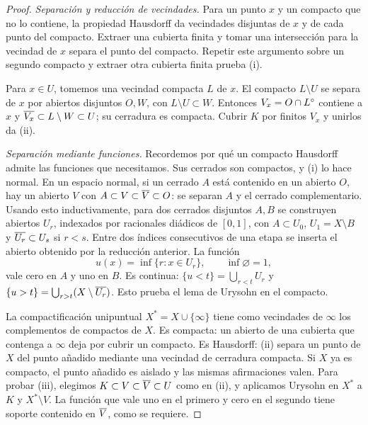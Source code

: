 \begin{proof}
\emph{Separación y reducción de vecindades.} Para un punto $x$ y un compacto que no lo contiene, la propiedad Hausdorff da vecindades disjuntas de $x$ y de cada punto del compacto. Extraer una cubierta finita y tomar una intersección para la vecindad de $x$ separa el punto del compacto. Repetir este argumento sobre un segundo compacto y extraer otra cubierta finita prueba (i).

Para $x\in U$, tomemos una vecindad compacta $L$ de $x$. El compacto $L\setminus U$ se separa de $x$ por abiertos disjuntos $O,W$, con $L\setminus U\subset W$. Entonces $V_x=O\cap L^{\circ}$ contiene a $x$ y $\overline{V_x}\subset L\setminus W\subset U$; su cerradura es compacta. Cubrir $K$ por finitos $V_x$ y unirlos da (ii).

\emph{Separación mediante funciones.} Recordemos por qué un compacto Hausdorff admite las funciones que necesitamos. Sus cerrados son compactos, y (i) lo hace normal. En un espacio normal, si un cerrado $A$ está contenido en un abierto $O$, hay un abierto $V$ con $A\subset V\subset\overline{V}\subset O$: se separan $A$ y el cerrado complementario. Usando esto inductivamente, para dos cerrados disjuntos $A,B$ se construyen abiertos $U_r$, indexados por racionales diádicos de $[0,1]$, con $A\subset U_0$, $U_1=X\setminus B$ y $\overline{U_r}\subset U_s$ si $r<s$. Entre dos índices consecutivos de una etapa se inserta el abierto obtenido por la reducción anterior. La función
\[
 u(x)=\inf\{r:x\in U_r\},\qquad\inf\varnothing=1,
\]
vale cero en $A$ y uno en $B$. Es continua: $\{u<t\}=\bigcup_{r<t}U_r$ y $\{u>t\}=\bigcup_{r>t}(X\setminus\overline{U_r})$. Esto prueba el lema de Urysohn en el compacto.

La compactificación unipuntual $X^*=X\cup\{\infty\}$ tiene como vecindades de $\infty$ los complementos de compactos de $X$. Es compacta: un abierto de una cubierta que contenga a $\infty$ deja por cubrir un compacto. Es Hausdorff: (ii) separa un punto de $X$ del punto añadido mediante una vecindad de cerradura compacta. Si $X$ ya es compacto, el punto añadido es aislado y las mismas afirmaciones valen. Para probar (iii), elegimos $K\subset V\subset\overline{V}\subset U$ como en (ii), y aplicamos Urysohn en $X^*$ a $K$ y $X^*\setminus V$. La función que vale uno en el primero y cero en el segundo tiene soporte contenido en $\overline{V}$, como se requiere.


\end{proof}
